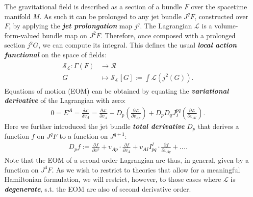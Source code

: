 \documentclass[%
 reprint,
nofootinbib,
 amsmath,amssymb,
 aps,
 prd,
floatfix,
]{revtex4-2}
\begin{document}
The gravitational field is described as a section of a bundle $F$ over the spacetime manifold $M$. As such it can be prolonged to any jet bundle $J^qF$, constructed over $F$, by applying the \textit{\textbf{jet prolongation}} map $j^q$. 
The Lagrangian $\mathcal{L}$ is a volume-form-valued bundle map on $J^2F$. Therefore, once composed with a prolonged section $j^2G$, we can compute its integral.
This defines the usual \textit{\textbf{local action functional}} on the space of fields:
\begin{align}
\begin{aligned}
    \mathcal{S}_{\mathcal{L}} : \Gamma(F) &\longrightarrow \mathcal{R} \\
    G &\longmapsto \mathcal{S}_{\mathcal{L}}[G] := \int \mathcal{L}(j^2(G)).
\end{aligned}
\end{align}
Equations of motion (EOM) can be obtained by equating the \textit{\textbf{variational derivative}} of the Lagrangian with zero:
\begin{align}
  0 = E^A = \frac{\delta \mathcal{L}}{\delta v_A} = 
  \frac{\partial\mathcal{L}}{\partial v_A} - D_p ( \frac{\partial \mathcal{L}}{\partial v_{Ap}}) 
  + D_p D_q J^{pq}_I (\frac{\partial \mathcal{L}}{\partial v_{AI}}).
\end{align}
Here we further introduced the jet bundle \textit{\textbf{total derivative}} $D_p$ that
derives a function $f$ on $J^qF$ to a function on $J^{q+1}$:
\begin{align}
    D_p f := \frac{\partial f}{\partial x^p} + v_{Ap} \cdot  \frac{\partial f}{\partial v_A} + v_{AI} I^{I}_{pq} \cdot \frac{\partial f}{ \partial v_{Aq}}+... .
\end{align}
Note that the EOM of a second-order Lagrangian are thus, in general, given by a function on $J^4F$. As we wish to restrict to theories that allow for a meaningful Hamiltonian formulation, we will restrict, however, to those cases where $\mathcal{L}$ is \textit{\textbf{degenerate}}, s.t. the EOM are also of second derivative order. 
\end{document}
